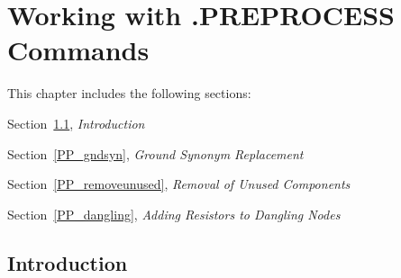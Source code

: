 



\chapter{Working with .PREPROCESS Commands}
\label{Preprocess_Chap}


{
This chapter includes the following sections:
\begin{XyceItemize}
\item Section~\ref{PP_Intro}, {\em Introduction}
\item Section~\ref{PP_gndsyn}, {\em Ground Synonym Replacement}
\item Section~\ref{PP_removeunused}, {\em Removal of Unused Components}
\item Section~\ref{PP_dangling}, {\em Adding Resistors to Dangling Nodes}

\end{XyceItemize}
}

\section{Introduction}
\label{PP_Intro}

